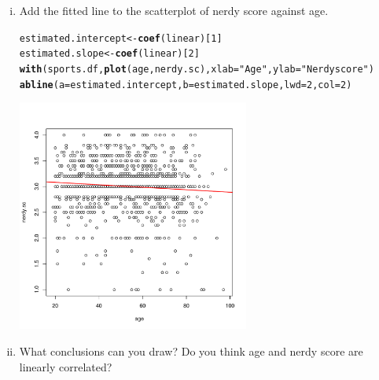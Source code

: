 \documentclass[12pt,a4paper]{article}\usepackage[]{graphicx}\usepackage[]{color}
\makeatletter
\newcommand{\hlnum}[1]{\textcolor[rgb]{0.686,0.059,0.569}{#1}}%
\newcommand{\hlstr}[1]{\textcolor[rgb]{0.192,0.494,0.8}{#1}}%
\newcommand{\hlstd}[1]{\textcolor[rgb]{0.345,0.345,0.345}{#1}}%
\newcommand{\hlkwb}[1]{\textcolor[rgb]{0.69,0.353,0.396}{#1}}%
\newcommand{\hlkwc}[1]{\textcolor[rgb]{0.333,0.667,0.333}{#1}}%
\newcommand{\hlkwd}[1]{\textcolor[rgb]{0.737,0.353,0.396}{\textbf{#1}}}%
\newenvironment{kframe}{%
 \def\at@end@of@kframe{}%
 \ifinner\ifhmode%
  \def\at@end@of@kframe{\end{minipage}}%
  \begin{minipage}{\columnwidth}%
 \fi\fi%
 \def\FrameCommand##1{\hskip\@totalleftmargin \hskip-\fboxsep
 \colorbox{shadecolor}{##1}\hskip-\fboxsep
     \hskip-\linewidth \hskip-\@totalleftmargin \hskip\columnwidth}%
 \MakeFramed {\advance\hsize-\width
   \@totalleftmargin\z@ \linewidth\hsize
   \@setminipage}}%
 {\par\unskip\endMakeFramed%
 \at@end@of@kframe}
\newenvironment{knitrout}{}{} %
\makeatother
\begin{document}
\begin{enumerate}[(i)]
\begin{knitrout}
{}



\end{knitrout}
\item Add the fitted line to the scatterplot of nerdy score against age.
\begin{knitrout}
\color{fgcolor}\begin{kframe}
\begin{alltt}
\hlstd{estimated.intercept} \hlkwb{<-} \hlkwd{coef}\hlstd{(linear)[}\hlnum{1}\hlstd{]}
\hlstd{estimated.slope} \hlkwb{<-} \hlkwd{coef}\hlstd{(linear)[}\hlnum{2}\hlstd{]}
\hlkwd{with}\hlstd{(sports.df,} \hlkwd{plot}\hlstd{(age, nerdy.sc),} \hlkwc{xlab} \hlstd{=} \hlstr{"Age"}\hlstd{,} \hlkwc{ylab} \hlstd{=} \hlstr{"Nerdy score"}\hlstd{)}
\hlkwd{abline}\hlstd{(}\hlkwc{a} \hlstd{= estimated.intercept,} \hlkwc{b} \hlstd{= estimated.slope,} \hlkwc{lwd} \hlstd{=} \hlnum{2}\hlstd{,} \hlkwc{col} \hlstd{=} \hlnum{2}\hlstd{)}
\end{alltt}
\end{kframe}

{\centering \includegraphics[width=0.6\textwidth]{figure/unnamed-chunk-5-1} 

}



\end{knitrout}
\item What conclusions can you draw? Do you think age and nerdy score are linearly correlated?
\end{enumerate}
\end{document}
